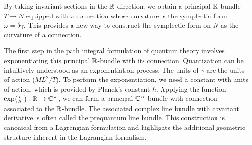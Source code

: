 By taking invariant sections in the $\mathbb{R}$-direction, we obtain a principal $\mathbb{R}$-bundle $T \rightarrow N$ equipped with a connection whose curvature is the symplectic form $\omega = \delta \gamma$. This provides a new way to construct the symplectic form on $N$ as the curvature of a connection.

\begin{remark}
The first step in the path integral formulation of quantum theory involves exponentiating this principal $\mathbb{R}$-bundle with its connection. Quantization can be intuitively understood as an exponentiation process. The units of $\gamma$ are the units of action ($ML^2/T$). To perform the exponentiation, we need a constant with units of action, which is provided by Planck's constant $\hbar$. Applying the function $\exp(\frac{i}{\hbar} \cdot): \mathbb{R} \rightarrow \mathbb{C}^\times$, we can form a principal $\mathbb{C}^\times$-bundle with connection associated to the $\mathbb{R}$-bundle. The associated complex line bundle with covariant derivative is often called the prequantum line bundle. This construction is canonical from a Lagrangian formulation and highlights the additional geometric structure inherent in the Lagrangian formalism.
\end{remark}

